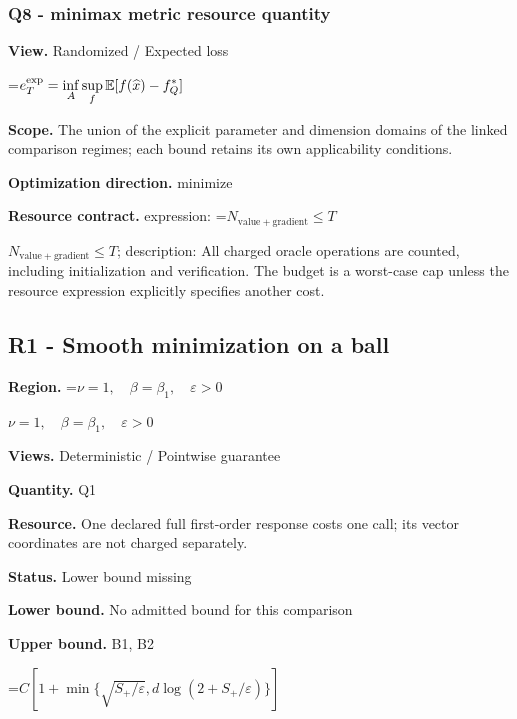 \documentclass[10pt,a4paper]{article}
\newcommand{\AtlasMath}[1]{\par\begingroup\centering\setbox0=\hbox{$\displaystyle #1$}\ifdim\wd0>1.4\linewidth\typeout{ATLAS WIDE FORMULA: \the\wd0}\fi\ifdim\wd0>\linewidth\resizebox{\linewidth}{!}{\box0}\else\box0\fi\par\endgroup}
\newcommand{\AtlasInlineMath}[1]{\begingroup\setbox0=\hbox{$#1$}\ifdim\wd0>.4\linewidth\endgroup\AtlasMath{#1}\else\endgroup$#1$\fi}
\begin{document}
\subsubsection{Q8 - minimax metric resource quantity}


\textbf{View.} Randomized / Expected loss



\AtlasMath{e_T^{\rm exp}=\inf_A\sup_f\mathbb E[f(\widehat x)-f_Q^*]}


\textbf{Scope.} The union of the explicit parameter and dimension domains of the linked comparison regimes; each bound retains its own applicability conditions.



\textbf{Optimization direction.} minimize



\textbf{Resource contract.} expression: \AtlasInlineMath{N_{\mathrm{value+gradient}}\le T}; description: All charged oracle operations are counted, including initialization and verification. The budget is a worst-case cap unless the resource expression explicitly specifies another cost.



\subsection{R1 - Smooth minimization on a ball}


\textbf{Region.} \AtlasInlineMath{\nu=1,\quad\beta=\beta_1,\quad\varepsilon>0}



\textbf{Views.} Deterministic / Pointwise guarantee



\textbf{Quantity.} Q1



\textbf{Resource.} One declared full first-order response costs one call; its vector coordinates are not charged separately.



\textbf{Status.} Lower bound missing



\textbf{Lower bound.} No admitted bound for this comparison



\textbf{Upper bound.} B1, B2



\AtlasMath{C[1+\min\{\sqrt{S_+/\varepsilon},d\log(2+S_+/\varepsilon)\}]}
\end{document}
